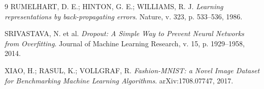 \documentclass[11pt,a4paper]{article}
\begin{document}
\begin{thebibliography}{9}
RUMELHART, D. E.; HINTON, G. E.; WILLIAMS, R. J.
\emph{Learning representations by back-propagating errors}.
Nature, v. 323, p. 533--536, 1986.

SRIVASTAVA, N. et al.
\emph{Dropout: A Simple Way to Prevent Neural Networks from Overfitting}.
Journal of Machine Learning Research, v. 15, p. 1929--1958, 2014.

XIAO, H.; RASUL, K.; VOLLGRAF, R.
\emph{Fashion-MNIST: a Novel Image Dataset for Benchmarking Machine Learning Algorithms}.
arXiv:1708.07747, 2017.
\end{thebibliography}
\end{document}
